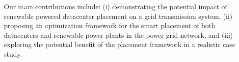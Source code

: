 
 Our main contributions include: (i) demonstrating the potential impact of renewable powered datacenter placement on a grid transmission system, (ii) proposing an optimization framework for the smart placement of both datacenters and renewable power plants in the power grid network, and (iii) exploring the potential benefit of the placement framework in a realistic case study.





